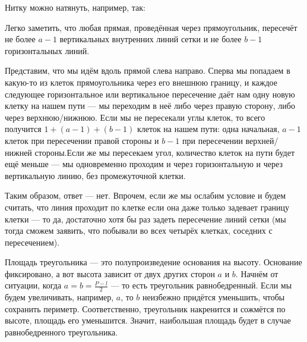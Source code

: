 \begin{itemize}
\itA Нитку можно натянуть, например, так:

\begin{center}\end{center}

\itB Легко заметить, что любая прямая, проведённая через прямоугольник, пересечёт не более $a-1$
вертикальных внутренних линий сетки и не более $b-1$ горизонтальных линий. 

Представим, что мы идём вдоль прямой слева направо. Сперва мы попадаем в какую-то из клеток прямоугольника через его внешнюю границу, и каждое следующее горизонтальное или вертикальное пересечение даёт нам одну новую клетку на нашем пути --- мы переходим в неё либо через правую сторону, либо через верхнюю/нижнюю. Если мы не пересекали углы клеток, то всего получится $1 + (a-1) + (b-1)$ клеток на нашем пути: одна начальная, $a-1$ клеток при пересечении правой стороны и $b-1$ при пересечении верхней/нижней стороны.Если же мы пересекаем угол, количество клеток на пути будет ещё меньше --- мы одновременно проходим и через горизонтальную и через вертикальную линию, без промежуточной клетки.

Таким образом, ответ --- нет. Впрочем, если же мы ослабим условие и будем считать, что линия проходит по клетке если она даже только задевает границу клетки --- то да, достаточно хотя бы раз задеть пересечение линий сетки (мы тогда сможем заявить, что побывали во всех четырёх клетках, соседних с пересечением). 

\itC Площадь треугольника --- это полупроизведение основания на высоту. Основание фиксировано, а вот
высота зависит от двух других сторон $a$ и $b$. Начнём от ситуации, когда $a = b = \frac{P-l}{2}$ --- то есть треугольник равнобедренный. Если мы будем увеличивать, например, $a$, то $b$ неизбежно придётся уменьшить,
чтобы сохранить периметр. Соответственно, треугольник накренится и сожмётся по высоте, площадь его уменьшится.
Значит, наибольшая площадь будет в случае равнобедренного треугольника.


\end{itemize}
